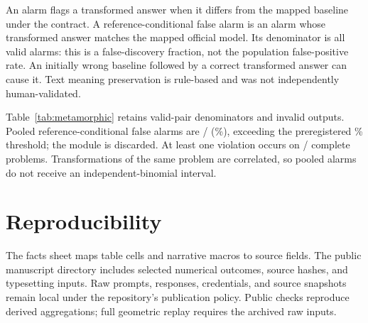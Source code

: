 An alarm flags a transformed answer when it differs from the mapped baseline under the contract. A reference-conditional false alarm is an alarm whose transformed answer matches the mapped official model. Its denominator is all valid alarms: this is a false-discovery fraction, not the population false-positive rate. An initially wrong baseline followed by a correct transformed answer can cause it. Text meaning preservation is rule-based and was not independently human-validated.

Table~\ref{tab:metamorphic} retains valid-pair denominators and invalid outputs. Pooled reference-conditional false alarms are \FalseK{}/\FlagN{} (\FalseRate{}\%), exceeding the preregistered \DiscardThreshold{}\% threshold; the module is discarded. At least one violation occurs on \AnyViolationK{}/\CompleteMetaN{} complete problems. Transformations of the same problem are correlated, so pooled alarms do not receive an independent-binomial interval.



\section{Reproducibility}
The facts sheet maps table cells and narrative macros to source fields. The public manuscript directory includes selected numerical outcomes, source hashes, and typesetting inputs. Raw prompts, responses, credentials, and source snapshots remain local under the repository's publication policy. Public checks reproduce derived aggregations; full geometric replay requires the archived raw inputs.
